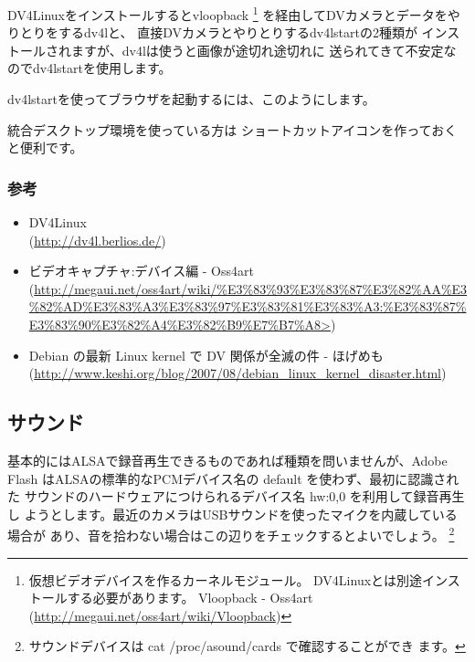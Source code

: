 \documentclass[mingoth,a4paper]{jsarticle}
\begin{document}
\begin{description}
DV4Linuxをインストールするとvloopback
\footnote{仮想ビデオデバイスを作るカーネルモジュール。 
DV4Linuxとは別途インストールする必要があります。
Vloopback - Oss4art (\url{http://megaui.net/oss4art/wiki/Vloopback})}
を経由してDVカメラとデータをやりとりをするdv4lと、
直接DVカメラとやりとりするdv4lstartの2種類が
インストールされますが、dv4lは使うと画像が途切れ途切れに
送られてきて不安定なのでdv4lstartを使用します。

dv4lstartを使ってブラウザを起動するには、このようにします。


統合デスクトップ環境を使っている方は
ショートカットアイコンを作っておくと便利です。

\end{description}

\subsubsection{参考}

\begin{itemize}
 \item DV4Linux \\
 (\url{http://dv4l.berlios.de/})
 \item ビデオキャプチャ:デバイス編 - Oss4art \\
            (\url{http://megaui.net/oss4art/wiki/%E3%83%93%E3%83%87%E3%82%AA%E3%82%AD%E3%83%A3%E3%83%97%E3%83%81%E3%83%A3:%E3%83%87%E3%83%90%E3%82%A4%E3%82%B9%E7%B7%A8>})
 \item Debian の最新 Linux kernel で DV 関係が全滅の件 - ほげめも \\
            (\url{http://www.keshi.org/blog/2007/08/debian_linux_kernel_disaster.html})
\end{itemize}

\subsection{サウンド}

基本的にはALSAで録音再生できるものであれば種類を問いませんが、Adobe
Flash はALSAの標準的なPCMデバイス名の default を使わず、最初に認識された
サウンドのハードウェアにつけられるデバイス名 hw:0,0 を利用して録音再生し
ようとします。最近のカメラはUSBサウンドを使ったマイクを内蔵している場合が
あり、音を拾わない場合はこの辺りをチェックするとよいでしょう。
\footnote{サウンドデバイスは cat /proc/asound/cards で確認することができ
ます。}
\end{document}
